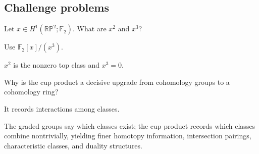 \subsection*{Challenge problems}

\begin{exercise}[RP2 mod 2]\label{exr:viii29-ped-15}
Let $x\in H^1(\mathbb{RP}^2;\mathbb F_2)$. What are $x^2$ and $x^3$?
\end{exercise}
\begin{hint}
Use $\mathbb F_2[x]/(x^3)$.
\end{hint}
\begin{solution}
$x^2$ is the nonzero top class and $x^3=0$.
\end{solution}

\begin{exercise}\label{exr:viii29-ped-16}
Why is the cup product a decisive upgrade from cohomology groups to a cohomology ring?
\end{exercise}
\begin{hint}
It records interactions among classes.
\end{hint}
\begin{solution}
The graded groups say which classes exist; the cup product records which classes combine nontrivially, yielding finer homotopy information, intersection pairings, characteristic classes, and duality structures.
\end{solution}

